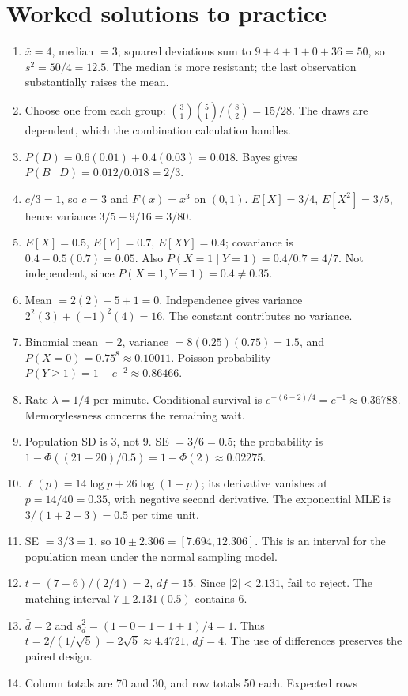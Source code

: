 \clearpage
\section{Worked solutions to practice}
\begin{enumerate}
\item $\bar x=4$, median $=3$; squared deviations sum to
$9+4+1+0+36=50$, so $s^2=50/4=12.5$. The median is more resistant;
the last observation substantially raises the mean.
\item Choose one from each group: $\binom31\binom51/\binom82=15/28$.
The draws are dependent, which the combination calculation handles.
\item $P(D)=0.6(0.01)+0.4(0.03)=0.018$.
Bayes gives $P(B\mid D)=0.012/0.018=2/3$.
\item $c/3=1$, so $c=3$ and $F(x)=x^3$ on $(0,1)$.
$E[X]=3/4$, $E[X^2]=3/5$, hence variance $3/5-9/16=3/80$.
\item $E[X]=0.5$, $E[Y]=0.7$, $E[XY]=0.4$; covariance is
$0.4-0.5(0.7)=0.05$. Also $P(X=1\mid Y=1)=0.4/0.7=4/7$.
Not independent, since $P(X=1,Y=1)=0.4\ne0.35$.
\item Mean $=2(2)-5+1=0$. Independence gives variance
$2^2(3)+(-1)^2(4)=16$. The constant contributes no variance.
\item Binomial mean $=2$, variance $=8(0.25)(0.75)=1.5$, and
$P(X=0)=0.75^8\approx0.10011$. Poisson probability
$P(Y\geq1)=1-e^{-2}\approx0.86466$.
\item Rate $\lambda=1/4$ per minute. Conditional survival is
$e^{-(6-2)/4}=e^{-1}\approx0.36788$. Memorylessness concerns the remaining wait.
\item Population SD is 3, not 9. SE $=3/6=0.5$; the probability is
$1-\Phi((21-20)/0.5)=1-\Phi(2)\approx0.02275$.
\item $\ell(p)=14\log p+26\log(1-p)$; its derivative vanishes at
$p=14/40=0.35$, with negative second derivative. The exponential MLE is
$3/(1+2+3)=0.5$ per time unit.
\item SE $=3/3=1$, so $10\pm2.306=[7.694,12.306]$.
This is an interval for the population mean under the normal sampling model.
\item $t=(7-6)/(2/4)=2$, $df=15$. Since $|2|<2.131$, fail to reject.
The matching interval $7\pm2.131(0.5)$ contains 6.
\item $\bar d=2$ and $s_d^2=(1+0+1+1+1)/4=1$.
Thus $t=2/(1/\sqrt5)=2\sqrt5\approx4.4721$, $df=4$.
The use of differences preserves the paired design.
\item Column totals are 70 and 30, and row totals 50 each. Expected rows

\end{enumerate}
